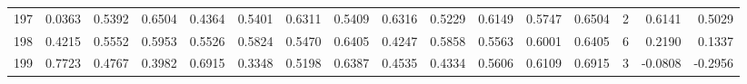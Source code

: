 \begin{tabular}{lrrrrrrrrrrrrrrr}
197 &      0.0363 &  0.5392 &  0.6504 &  0.4364 &  0.5401 &  0.6311 &  0.5409 &  0.6316 &  0.5229 &  0.6149 &   0.5747 &     0.6504 &      2 &                    0.6141 &                     0.5029 \\
198 &      0.4215 &  0.5552 &  0.5953 &  0.5526 &  0.5824 &  0.5470 &  0.6405 &  0.4247 &  0.5858 &  0.5563 &   0.6001 &     0.6405 &      6 &                    0.2190 &                     0.1337 \\
199 &      0.7723 &  0.4767 &  0.3982 &  0.6915 &  0.3348 &  0.5198 &  0.6387 &  0.4535 &  0.4334 &  0.5606 &   0.6109 &     0.6915 &      3 &                   -0.0808 &                    -0.2956 \\
\bottomrule
\end{tabular}
